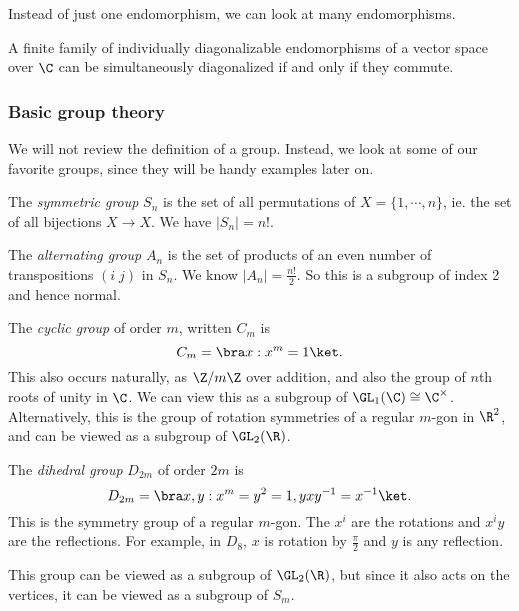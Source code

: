 \documentclass[a4paper]{article}
\begin{document}
Instead of just one endomorphism, we can look at many endomorphisms.

\begin{prop}
  A finite family of individually diagonalizable endomorphisms of a vector space over $\C$ can be simultaneously diagonalized if and only if they commute.
\end{prop}

\subsubsection*{Basic group theory}
We will not review the definition of a group. Instead, we look at some of our favorite groups, since they will be handy examples later on.

\begin{defi}
  The \emph{symmetric group} $S_n$ is the set of all permutations of $X = \{1, \cdots, n\}$, ie. the set of all bijections $X \to X$. We have $|S_n| = n!$.
\end{defi}

\begin{defi}
  The \emph{alternating group} $A_n$ is the set of products of an even number of transpositions $(i\; j)$ in $S_n$. We know $|A_n| = \frac{n!}{2}$. So this is a subgroup of index 2 and hence normal.
\end{defi}

\begin{defi}
  The \emph{cyclic group} of order $m$, written $C_m$ is
  \[
    C_m = \bra x: x^m = 1\ket.
  \]
  This also occurs naturally, as $\Z/m\Z$ over addition, and also the group of $n$th roots of unity in $\C$. We can view this as a subgroup of $\GL_1(\C) \cong \C^\times$. Alternatively, this is the group of rotation symmetries of a regular $m$-gon in $\R^2$, and can be viewed as a subgroup of $\GL_2(\R)$.
\end{defi}

\begin{defi}
  The \emph{dihedral group} $D_{2m}$ of order $2m$ is
  \[
    D_{2m} = \bra x, y: x^m = y^2 = 1, yxy^{-1} = x^{-1}\ket.
  \]
  This is the symmetry group of a regular $m$-gon. The $x^i$ are the rotations and $x^i y$ are the reflections. For example, in $D_8$, $x$ is rotation by $\frac{\pi}{2}$ and $y$ is any reflection.

  This group can be viewed as a subgroup of $\GL_2(\R)$, but since it also acts on the vertices, it can be viewed as a subgroup of $S_m$.
\end{defi}
\end{document}
